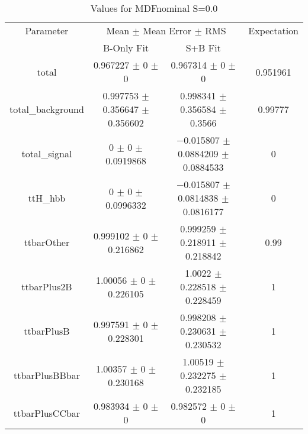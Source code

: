 \begin{table}
\centering
\caption{Values for MDFnominal S=0.0}
\begin{tabular}{cccc}
\toprule
Parameter & \multicolumn{2}{c}{Mean $\pm$ Mean Error $\pm$ RMS} & Expectation\\
 & B-Only Fit & S+B Fit & \\
\midrule
total & \num{0.967227} $\pm$ \num{0} $\pm$ \num{0} & \num{0.967314} $\pm$ \num{0} $\pm$ \num{0} & \num{0.951961}\\
total\_background & \num{0.997753} $\pm$ \num{0.356647} $\pm$ \num{0.356602} & \num{0.998341} $\pm$ \num{0.356584} $\pm$ \num{0.3566} & \num{0.99777}\\
total\_signal & \num{0} $\pm$ \num{0} $\pm$ \num{0.0919868} & \num{-0.015807} $\pm$ \num{0.0884209} $\pm$ \num{0.0884533} & \num{0}\\
ttH\_hbb & \num{0} $\pm$ \num{0} $\pm$ \num{0.0996332} & \num{-0.015807} $\pm$ \num{0.0814838} $\pm$ \num{0.0816177} & \num{0}\\
ttbarOther & \num{0.999102} $\pm$ \num{0} $\pm$ \num{0.216862} & \num{0.999259} $\pm$ \num{0.218911} $\pm$ \num{0.218842} & \num{0.99}\\
ttbarPlus2B & \num{1.00056} $\pm$ \num{0} $\pm$ \num{0.226105} & \num{1.0022} $\pm$ \num{0.228518} $\pm$ \num{0.228459} & \num{1}\\
ttbarPlusB & \num{0.997591} $\pm$ \num{0} $\pm$ \num{0.228301} & \num{0.998208} $\pm$ \num{0.230631} $\pm$ \num{0.230532} & \num{1}\\
ttbarPlusBBbar & \num{1.00357} $\pm$ \num{0} $\pm$ \num{0.230168} & \num{1.00519} $\pm$ \num{0.232275} $\pm$ \num{0.232185} & \num{1}\\
ttbarPlusCCbar & \num{0.983934} $\pm$ \num{0} $\pm$ \num{0} & \num{0.982572} $\pm$ \num{0} $\pm$ \num{0} & \num{1}\\
\bottomrule
\end{tabular}
\end{table}